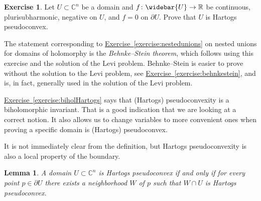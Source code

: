 \documentclass[12pt,openany]{book}
\newcommand{\C}{{\mathbb{C}}}
\newcommand{\R}{{\mathbb{R}}}
\newcommand{\myindex}[1]{#1\index{#1}}
\theoremstyle{plain}
\newtheorem{lemma}[thm]{Lemma}
\theoremstyle{remark}
\theoremstyle{definition}
\newenvironment{exbox}{%
    \def\FrameCommand{\vrule width 1pt \relax\hspace{10pt}}%
    \MakeFramed{\advance\hsize-\width\FrameRestore}%
}{%
    \endMakeFramed
}
\theoremstyle{exercise}
\newtheorem{exercise}{Exercise}[section]
\theoremstyle{example}
\newcommand{\exerciseref}[1]{\hyperref[#1]{Exercise~\ref*{#1}}}
\begin{document}
\begin{exbox}
\begin{exercise}
Let $U \subset \C^n$ be a domain and $f \colon \widebar{U} \to \R$ be
continuous, plurisubharmonic, negative on $U$, and $f=0$ on $\partial
U$.  Prove that $U$ is Hartogs pseudoconvex.
\end{exercise}
\end{exbox}

The statement corresponding to \exerciseref{exercise:nestedunions} on nested unions
for domains of holomorphy is
the \emph{\myindex{Behnke--Stein theorem}}, which follows using this exercise and the solution
of the Levi problem.
Behnke--Stein is easier to prove without the solution to the Levi problem,
see \exerciseref{exercise:behnkestein}, and is, in fact, generally used in
the solution of the Levi problem.

\exerciseref{exercise:biholHartogs} says that (Hartogs) pseudoconvexity is a
biholomorphic invariant.  That is a good indication that we are looking at a
correct notion.  It also allows us to change variables to more convenient
ones when proving a specific domain is (Hartogs) pseudoconvex.

It is not immediately clear from the definition,
but Hartogs pseudoconvexity
is also a local property of the boundary.

\begin{lemma}
\pagebreak[2]
A domain $U \subset \C^n$ is Hartogs pseudoconvex if and only if
for every point $p \in \partial U$ there exists a neighborhood $W$ of $p$
such that $W \cap U$ is Hartogs pseudoconvex.
\end{lemma}
\end{document}
